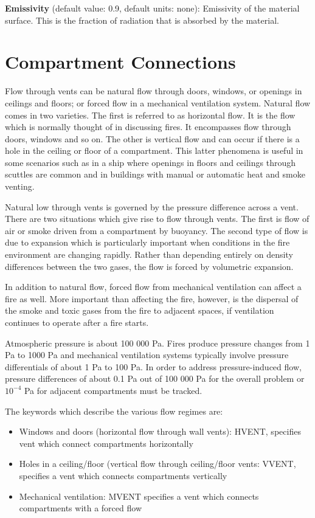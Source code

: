 \textbf{Emissivity} (default value: 0.9, default units: none): Emissivity of the material surface.  This is the fraction of radiation that is absorbed by the material.

\newpage
\section{Compartment Connections}

Flow through vents can be natural flow through doors, windows, or openings in ceilings and floors; or forced flow in a mechanical ventilation system.  Natural flow comes in two varieties.  The first is referred to as horizontal flow.  It is the flow which is normally thought of in discussing fires.  It encompasses flow through doors, windows and so on.  The other is vertical flow and can occur if there is a hole in the ceiling or floor of a compartment.  This latter phenomena is useful in some scenarios such as in a ship where openings in floors and ceilings through scuttles are common and in buildings with manual or automatic heat and smoke venting.

Natural low through vents is governed by the pressure difference across a vent.  There are two situations which give rise to flow through vents.  The first is flow of air or smoke driven from a compartment by buoyancy.  The second type of flow is due to expansion which is particularly important when conditions in the fire environment are changing rapidly.  Rather than depending entirely on density differences between the two gases, the flow is forced by volumetric expansion.

In addition to natural flow, forced flow from mechanical ventilation can affect a fire as well. More important than affecting the fire, however, is the dispersal of the smoke and toxic gases from the fire to adjacent spaces, if ventilation continues to operate after a fire starts.

Atmospheric pressure is about 100 000 Pa. Fires produce pressure changes from 1 Pa to 1000 Pa and mechanical ventilation systems typically involve pressure differentials of about 1 Pa to 100 Pa.  In order to address pressure-induced flow, pressure differences of about 0.1 Pa out of 100 000 Pa for the overall problem or $10^{-4}$ Pa for adjacent compartments must be tracked.

The keywords which describe the various flow regimes are:

\begin{itemize}
\item Windows and doors (horizontal flow through wall vents): HVENT, specifies vent which connect compartments horizontally
\item Holes in a ceiling/floor (vertical flow through ceiling/floor vents: VVENT, specifies a vent which connects compartments vertically
\item Mechanical ventilation: MVENT specifies a vent which connects compartments with a forced flow
\end{itemize}

